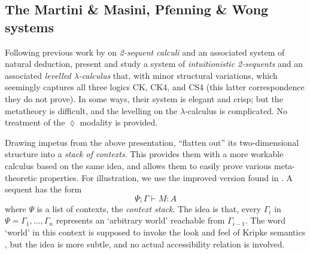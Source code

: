 \documentclass[a4paper]{amsart}
\begin{document}
\subsection{The Martini \& Masini, Pfenning \& Wong systems}


Following previous work by \cite{Masini1992, Masini1993} on
\emph{2-sequent calculi} and an associated system of natural
deduction, \cite{Martini1995} present and study a system of
\emph{intuitionistic 2-sequents} and an associated \emph{levelled
$\lambda$-calculus} that, with minor structural variations, which
seemingly captures all three logics \textsf{CK}, \textsf{CK4}, and
\textsf{CS4} (this latter correspondence they do not prove).
In some ways, their system is elegant and crisp; but the
metatheory is difficult, and the levelling on the
$\lambda$-calculus is complicated. No treatment of the $\lozenge$
modality is provided.

Drawing impetus from the above presentation, \cite{Pfenning1995}
``flatten out'' its two-dimensional structure into a \emph{stack
of contexts}. This provides them with a more workable calculus
based on the same idea, and allows them to easily prove various
meta-theoretic properties.  For illustration, we use the improved
version found in \cite[\S 5]{Davies2001a}. A sequent has the form
\[
  \Psi ; \Gamma  \vdash M : A
\] where $\Psi$ is a list of contexts, the \emph{context stack}.
The idea is that, every $\Gamma_i$ in $\Psi = \Gamma_1, \dots,
\Gamma_n$ represents an `arbitrary world' reachable from
$\Gamma_{i-1}$.  The word `world' in this context is supposed to
invoke the look and feel of Kripke semantics \citep{Kripke1963},
but the idea is more subtle, and no actual accessibility relation
is involved. 
\end{document}
